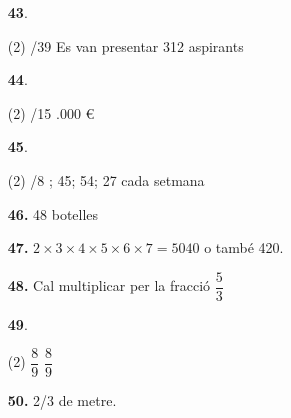 \documentclass[a4paper, pdf, twoside]{book}
\begin{document}
\begin{multicols}{2}
\begin{enumerate}

 \item[\fontfamily{phv}\selectfont\color{blue}\textbf{43}. ] 
 \begin{tasks}[column-sep=1em, item-indent=1.3333em](2)
	 /39
	 \task Es van presentar 312 aspirants
\end{tasks}
\vspace{0.25cm}



 \item[\fontfamily{phv}\selectfont\color{blue}\textbf{44}. ] 
 \begin{tasks}[column-sep=1em, item-indent=1.3333em](2)
	 /15
	 .000 \euro {}
\end{tasks}
\vspace{0.25cm}



 \item[\fontfamily{phv}\selectfont\color{blue}\textbf{45}. ] 
 \begin{tasks}[column-sep=1em, item-indent=1.3333em](2)
	 /8
	 ; 45; 54; 27 cada setmana
\end{tasks}
\vspace{0.25cm}
\item[\fontfamily{phv}\selectfont\color{blue}\textbf{46. }] 
48 botelles
\vspace{0.25cm}
\item[\fontfamily{phv}\selectfont\color{blue}\textbf{47. }] 
$2\times 3\times 4\times 5\times 6\times 7=5040$ o també 420.
\vspace{0.25cm}
\item[\fontfamily{phv}\selectfont\color{blue}\textbf{48. }] 
Cal multiplicar per la fracció $\dfrac {5}{3}$
\vspace{0.25cm}



 \item[\fontfamily{phv}\selectfont\color{blue}\textbf{49}. ] 
 \begin{tasks}[column-sep=1em, item-indent=1.3333em](2)
	 \task $\dfrac {8}{9}$
	 \task $\dfrac {8}{9}$
\end{tasks}
\vspace{0.25cm}
\item[\fontfamily{phv}\selectfont\color{blue}\textbf{50. }] 
2/3 de metre.
 \end{enumerate}
\vspace{0.3cm}


\end{multicols}
\end{document}

